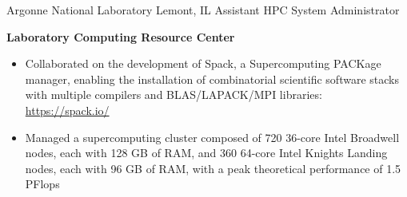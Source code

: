 
        {Argonne National Laboratory}
        {Lemont, IL}
        {Assistant HPC System Administrator}
        {}{
    \textbf{Laboratory Computing Resource Center}
    \begin{itemize}
        \item Collaborated on the development of Spack, a Supercomputing PACKage manager, enabling the installation of combinatorial scientific software stacks with multiple compilers and BLAS/LAPACK/MPI libraries: \url{https://spack.io/}
        \item Managed a supercomputing cluster composed of 720 36-core Intel Broadwell nodes, each with 128 GB of RAM, and 360 64-core Intel Knights Landing nodes, each with 96 GB of RAM, with a peak theoretical performance of 1.5 PFlops
    \end{itemize}
}